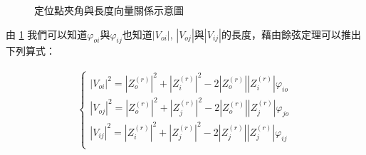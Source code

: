 	\begin{figure}
    \begin{center}
    \end{center}
    \caption{定位點夾角與長度向量關係示意圖}
    \label{fig:Localization Relationship}
    \end{figure}


	由 \ref{fig:Localization Relationship} 我們可以知道$\varphi _{oi}$與$\varphi _{ij}$也知道$|V_{oi}|$, $|V_{oj}|$與$|V_{ij}|$的長度，藉由餘弦定理可以推出下列算式：
	
	\begin{align}
		\left\{
		\begin{array}{cccc}
		|V_{oi}|^2 = |Z_o^{(r)}|^2 + |Z_i^{(r)}|^2 - 2|Z_o^{(r)}||Z_i^{(r)}|\varphi _{io}\\
		|V_{oj}|^2 = |Z_o^{(r)}|^2 + |Z_j^{(r)}|^2 - 2|Z_o^{(r)}||Z_j^{(r)}|\varphi _{jo}\\
		|V_{ij}|^2 = |Z_i^{(r)}|^2 + |Z_j^{(r)}|^2 - 2|Z_j^{(r)}||Z_j^{(r)}|\varphi _{ij}\\
		\end{array}
		\right.
	\end{align}	
	
